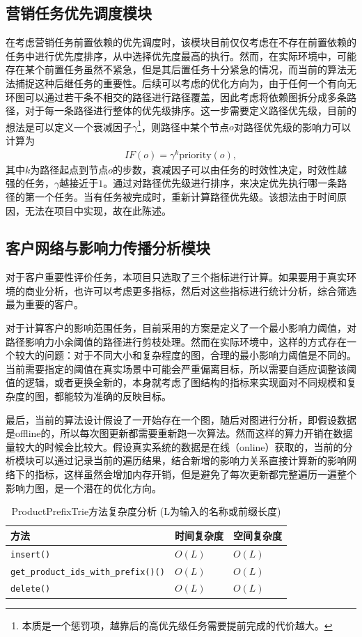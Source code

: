 \documentclass[cn,hazy,blue,10pt,normal]{elegantnote}
\begin{document}
\subsection{营销任务优先调度模块}
在考虑营销任务前置依赖的优先调度时，该模块目前仅仅考虑在不存在前置依赖的任务中进行优先度排序，从中选择优先度最高的执行。然而，在实际环境中，可能存在某个前置任务虽然不紧急，但是其后置任务十分紧急的情况，而当前的算法无法捕捉这种后继任务的重要性。后续可以考虑的优化方向为，由于任何一个有向无环图可以通过若干条不相交的路径进行路径覆盖，因此考虑将依赖图拆分成多条路径，对于每一条路径进行整体的优先级排序。这一步需要定义路径优先级，目前的想法是可以定义一个衰减因子$\gamma$\footnote{本质是一个惩罚项，越靠后的高优先级任务需要提前完成的代价越大。}，则路径中某个节点$o$对路径优先级的影响力可以计算为
\begin{align*}
    IF(o) = \gamma^k \text{priority}(o),
\end{align*}
其中$k$为路径起点到节点$o$的步数，衰减因子可以由任务的时效性决定，时效性越强的任务，$\gamma$越接近于$1$。通过对路径优先级进行排序，来决定优先执行哪一条路径的第一个任务。当有任务被完成时，重新计算路径优先级。该想法由于时间原因，无法在项目中实现，故在此陈述。


\subsection{客户网络与影响力传播分析模块}
对于客户重要性评价任务，本项目只选取了三个指标进行计算。如果要用于真实环境的商业分析，也许可以考虑更多指标，然后对这些指标进行统计分析，综合筛选最为重要的客户。

对于计算客户的影响范围任务，目前采用的方案是定义了一个最小影响力阈值，对路径影响力小余阈值的路径进行剪枝处理。然而在实际环境中，这样的方式存在一个较大的问题：对于不同大小和复杂程度的图，合理的最小影响力阈值是不同的。当前需要指定的阈值在真实场景中可能会严重偏离目标，所以需要自适应调整该阈值的逻辑，或者更换全新的，本身就考虑了图结构的指标来实现面对不同规模和复杂度的图，都能较为准确的反映目标。

最后，当前的算法设计假设了一开始存在一个图，随后对图进行分析，即假设数据是offline的，所以每次图更新都需要重新跑一次算法。然而这样的算力开销在数据量较大的时候会比较大。假设真实系统的数据是在线（online）获取的，当前的分析模块可以通过记录当前的遍历结果，结合新增的影响力关系直接计算新的影响网络下的指标，这样虽然会增加内存开销，但是避免了每次更新都完整遍历一遍整个影响力图，是一个潜在的优化方向。

\begin{table}[t]
    \centering
    \caption{ProductPrefixTrie方法复杂度分析 (L为输入的名称或前缀长度)}
    \label{tab: trie_complexity}
    \begin{tabular}{lll}
    \toprule
    方法& 时间复杂度& 空间复杂度 \\
    \midrule
    \texttt{insert()} & $O(L)$ & $O(L)$ \\
    \texttt{get\_product\_ids\_with\_prefix()()} & $O(L)$ & $O(L)$ \\
    \texttt{delete()} & $O(L)$ & $O(L)$ \\
    \bottomrule
    \end{tabular}
\end{table}
\end{document}
